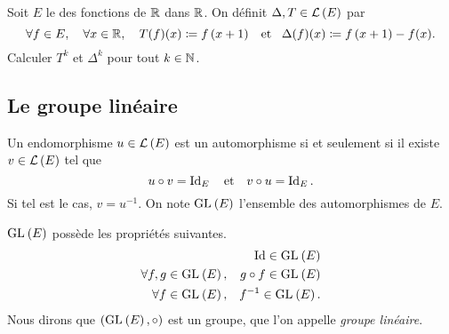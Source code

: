 \documentclass{magnolia}
\begin{document}



\begin{exoUnique}
\exo Soit $E$ le \Rev des fonctions de $\mathbb{R}$ dans $\mathbb{R}$. On définit
  $\Delta,T\in\mathcal{L}\left(E\right)$ par
  \[\forall f\in E ,\quad \forall x\in\mathbb{R} ,\quad T(f)(x)\coloneqq f\left(x+1\right) \quad\!\text{et}\quad\!
    \Delta(f)(x)\coloneqq f\left(x+1\right)-f(x).\]
  Calculer $T^k$ et $\Delta^k$ pour tout $k\in\mathbb{N}$.
\end{exoUnique}

\subsection{Le groupe linéaire}

\begin{definition}
Un endomorphisme $u\in\mathcal{L}\left(E\right)$ est un automorphisme si et seulement si il existe $v\in\mathcal{L}\left(E\right)$ tel que
\[u\circ v = \operatorname{Id}_E \quad\text{et}\quad v\circ u=\operatorname{Id}_E.\]
Si tel est le cas, $v=u^{-1}$. On note ${\rm GL}_{}\left(E\right)$ l'ensemble des automorphismes de $E$.
\end{definition}

\begin{proposition}
  ${\rm GL}_{}\left(E\right)$ possède les propriétés suivantes.
\begin{eqnarray*}
& & \operatorname{Id}\in{\rm GL}_{}\left(E\right)\\
\forall f,g\in{\rm GL}_{}\left(E\right),& & g\circ f\in{\rm GL}_{}\left(E\right)\\
\forall f\in{\rm GL}_{}\left(E\right),& & f^{-1}\in{\rm GL}_{}\left(E\right).
\end{eqnarray*}
Nous dirons que $({\rm GL}_{}\left(E\right),\circ)$ est un groupe, que l'on appelle \emph{groupe linéaire}.
\end{proposition}
\end{document}
